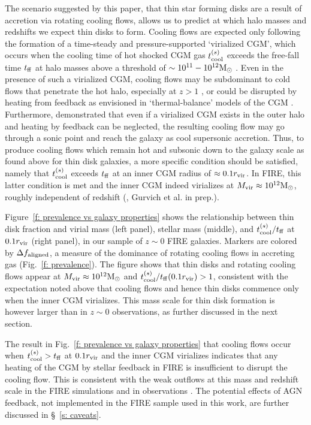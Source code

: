 \documentclass[fleqn,usenatbib]{mnras}
\newcommand{\Rvir}{r_{\rm vir}}
\newcommand{\msun}{{\rm M}_\odot}
\begin{document}
The scenario suggested by this paper, that thin star forming disks are a result of accretion via rotating cooling flows, allows us to predict at which halo masses and redshifts we expect thin disks to form.
Cooling flows are expected only following the formation of a time-steady and pressure-supported `virialized CGM', which occurs when the cooling time of hot shocked CGM gas $t_{\rm cool}^{(s)}$ exceeds the free-fall time $t_{\rm ff}$ at halo masses above a threshold of $\sim10^{11}-10^{12}\msun$ \citep{White1978, White1991, Birnboim2003}. 
Even in the presence of such a virialized CGM, cooling flows may be subdominant to cold flows that penetrate the hot halo, especially at $z>1$ \cite[e.g.,][]{Keres2005,Dekel2006, Dekel2009}, or could be disrupted by heating from feedback as envisioned in `thermal-balance'  models of the CGM \citep[e.g.,][]{Mccourt2012, Sharma2012, Voit2017, Faerman2017, Faerman2020}.
Furthermore, \cite{Stern2019} demonstrated that even if a virialized CGM exists in the outer halo and heating by feedback can be neglected, the resulting cooling flow may go through a sonic point and reach the galaxy as cool supersonic accretion.
Thus, to produce cooling flows which remain hot and subsonic down to the galaxy scale as found above for thin disk galaxies, a more specific condition should be satisfied, namely that $t_{\rm cool}^{(s)}$ exceeds $t_{\rm ff}$ at an inner CGM radius of $\approx0.1 r_{\rm vir}$.
In FIRE, this latter condition is met and the inner CGM indeed virializes at $\Mvir\approx10^{12}\msun$, roughly independent of redshift (\citealt{Stern2021}, Gurvich et al. in prep.).

Figure~\ref{f: prevalence vs galaxy properties} shows the relationship between thin disk fraction and virial mass (left panel), stellar mass (middle), and $t_{\rm cool}^{(s)}/t_{\rm ff}$ at $0.1 r_{\rm vir}$ (right panel), in our sample of $z\sim0$ FIRE galaxies.
Markers are colored by $\Delta f_{\rm aligned}$, a measure of the dominance of rotating cooling flows in accreting gas (Fig.~\ref{f: prevalence}).
The figure shows that thin disks and rotating cooling flows appear at $M_{\rm vir}\approx 10^{12}\msun$ and $\tcoolsh/\tff(0.1\Rvir)>1$, consistent with the expectation noted above that cooling flows and hence thin disks commence only when the inner CGM virializes.
This mass scale for thin disk formation is however larger than in $z\sim0$ observations, as further discussed in the next section.

The result in Fig.~\ref{f: prevalence vs galaxy properties} that cooling flows occur when $t_{\rm cool}^{(s)}>t_{\rm ff}$ at $0.1\Rvir$ and the inner CGM virializes indicates that any heating of the CGM by stellar feedback in FIRE is insufficient to disrupt the cooling flow.
This is consistent with the weak outflows at this mass and redshift scale in the FIRE simulations \citep{Muratov2015, Muratov2017, Stern2021, Pandya2021} and in observations \citep[e.g.,][]{Heckman2019}.
The potential effects of AGN feedback, not implemented in the FIRE sample used in this work, are further discussed in \S~\ref{s: caveats}. 
\end{document}
